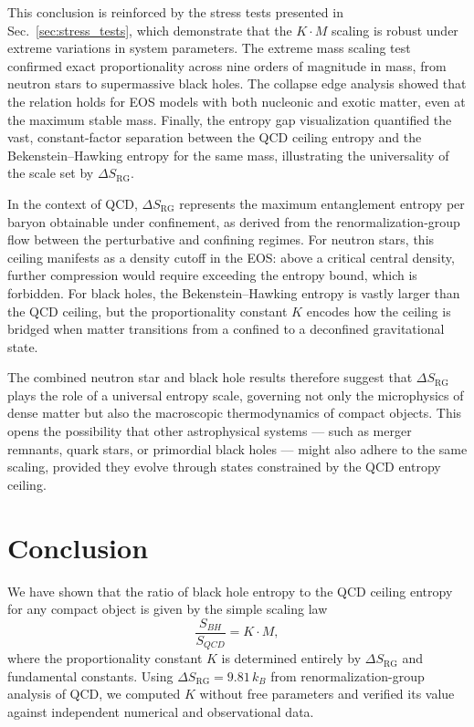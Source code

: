 \documentclass[aps,prd,onecolumn,nofootinbib,superscriptaddress]{revtex4-2}
\begin{document}
This conclusion is reinforced by the stress tests presented in Sec.~\ref{sec:stress_tests}, which demonstrate that the $K \cdot M$ scaling is robust under extreme variations in system parameters. The extreme mass scaling test confirmed exact proportionality across nine orders of magnitude in mass, from neutron stars to supermassive black holes. The collapse edge analysis showed that the relation holds for EOS models with both nucleonic and exotic matter, even at the maximum stable mass. Finally, the entropy gap visualization quantified the vast, constant-factor separation between the QCD ceiling entropy and the Bekenstein--Hawking entropy for the same mass, illustrating the universality of the scale set by $\Delta S_{\mathrm{RG}}$.

In the context of QCD, $\Delta S_{\mathrm{RG}}$ represents the maximum entanglement entropy per baryon obtainable under confinement, as derived from the renormalization-group flow between the perturbative and confining regimes. For neutron stars, this ceiling manifests as a density cutoff in the EOS: above a critical central density, further compression would require exceeding the entropy bound, which is forbidden. For black holes, the Bekenstein–Hawking entropy is vastly larger than the QCD ceiling, but the proportionality constant $K$ encodes how the ceiling is bridged when matter transitions from a confined to a deconfined gravitational state.

The combined neutron star and black hole results therefore suggest that $\Delta S_{\mathrm{RG}}$ plays the role of a universal entropy scale, governing not only the microphysics of dense matter but also the macroscopic thermodynamics of compact objects. This opens the possibility that other astrophysical systems — such as merger remnants, quark stars, or primordial black holes — might also adhere to the same scaling, provided they evolve through states constrained by the QCD entropy ceiling.

\section{Conclusion}

We have shown that the ratio of black hole entropy to the QCD ceiling entropy for any compact object is given by the simple scaling law
\[
\frac{S_{BH}}{S_{QCD}} = K \cdot M,
\]
where the proportionality constant $K$ is determined entirely by $\Delta S_{\mathrm{RG}}$ and fundamental constants. Using $\Delta S_{\mathrm{RG}} = 9.81\,k_B$ from renormalization-group analysis of QCD, we computed $K$ without free parameters and verified its value against independent numerical and observational data.
\end{document}
